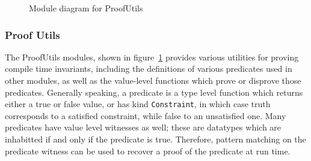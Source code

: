 \documentclass[12pt, svgnames]{article}
\let\Oldsubsubsection\subsubsection
\renewcommand{\subsubsection}{\FloatBarrier\Oldsubsubsection}
\begin{document}
\begin{figure}[!ht]
{{
}}\caption{Module diagram for ProofUtils} \label{fig:utilsMod}
\end{figure}

\Oldsubsubsection{Proof Utils}

The ProofUtils modules, shown in figure~\ref{fig:utilsMod} provides various
utilities for proving compile time invariants, including the definitions of
various predicates used in other modules, as well as the value-level functions
which prove or disprove those predicates. Generally speaking, a predicate is a
type level function which returns either a true or false value, or has kind
\lstinline{Constraint}, in which case truth corresponds to a satisfied
constraint, while false to an unsatisfied one. Many predicates have value level
witnesses as well; these are datatypes which are inhabitted if and only if the
predicate is true.  Therefore, pattern matching on the predicate witness can be
used to recover a proof of the predicate at run time.
\end{document}
